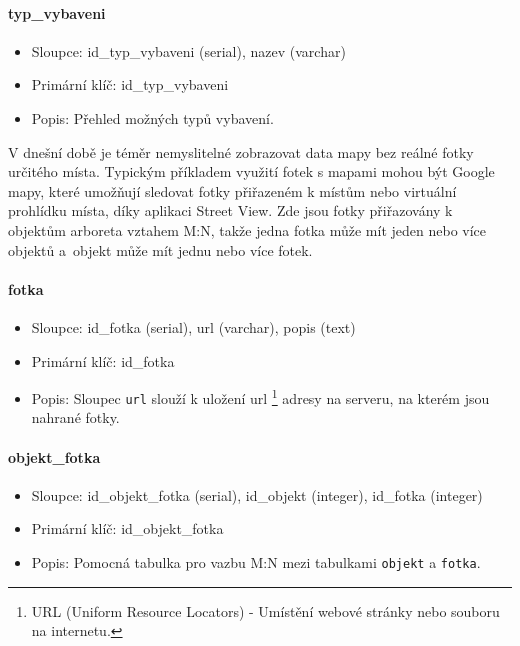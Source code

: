 \documentclass[12pt]{article}%
\begin{document}
{{\paragraph{typ\_vybaveni}
\begin{itemize}
\item Sloupce: id\_typ\_vybaveni (serial), nazev (varchar)
\item Primární klíč: id\_typ\_vybaveni
\item Popis: Přehled možných typů vybavení.
\end{itemize}

V dnešní době je téměr nemyslitelné zobrazovat data mapy bez reálné fotky určitého místa.
Typickým příkladem využití fotek s mapami mohou být Google mapy, které umožňují sledovat fotky
přiřazeném k místům nebo virtuální prohlídku místa, díky aplikaci Street View. Zde jsou fotky
přiřazovány k objektům arboreta vztahem M:N, takže jedna fotka může mít jeden nebo více objektů 
a~objekt může mít jednu nebo více fotek.

\paragraph{fotka}
\begin{itemize}
\item Sloupce: id\_fotka (serial), url (varchar), popis (text)
\item Primární klíč: id\_fotka
\item Popis: Sloupec \texttt{url} slouží k uložení url
\footnote{URL (Uniform Resource Locators) - Umístění webové stránky nebo souboru na internetu.} 
adresy na serveru, na kterém jsou nahrané fotky.
\end{itemize}

\paragraph{objekt\_fotka}
\begin{itemize}
\item Sloupce: id\_objekt\_fotka (serial), id\_objekt (integer), id\_fotka (integer)
\item Primární klíč: id\_objekt\_fotka
\item Popis: Pomocná tabulka pro vazbu M:N mezi tabulkami \texttt{objekt} a \texttt{fotka}.
\end{itemize}

\obrazek
{}
\newpage

}}
\end{document}
